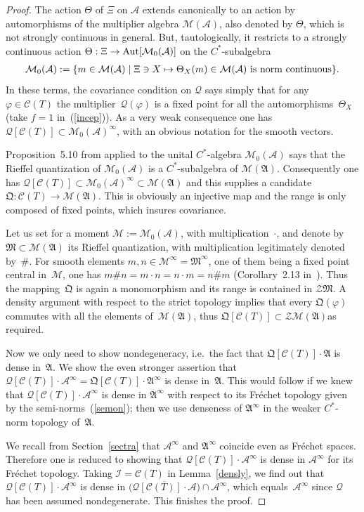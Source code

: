 \documentclass[pdftex]{sigma}
\def\A{{\mathcal A}}
\def\Th{\Theta}
\def\QQ{\mathfrak Q}
\def\AA{\mathfrak A}
\def\C{\mathcal{C}}
\def\Q{\mathcal Q}
\begin{document}
\begin{proof}
The action $\Th$ of $\Xi$ on $\A$ extends canonically to an action by automorphisms of the multiplier algebra
$\mathcal M(\A)$, also denoted by $\Th$, which is not strongly continuous in general.
But, tautologically, it restricts to a strongly continuous action
$\Th:\Xi\rightarrow{\rm Aut}[\mathcal M_0(\A)]$ on the $C^*$-subalgebra
\begin{gather*}%
\mathcal M_0(\A):=\{m\in\mathcal M(\A)\mid\Xi\ni X\mapsto\Th_X(m)\in\mathcal M(\A)\ {\rm is\ norm\ continuous}\}.
\end{gather*}
In these terms, the covariance condition on $\Q$ says simply that for any $\varphi\in\C(T)$ the multip\-lier~$\Q(\varphi)$ is a f\/ixed point for all the automorphisms~$\Th_X$
(take $f=1$ in~(\ref{incep})). As a very weak consequence one has
$\Q[\C(T)]\subset\mathcal M_0(\A)^\infty$, with an obvious notation for the smooth vectors.

Proposition~5.10 from \cite{Rie1} applied to the unital $C^*$-algebra $\mathcal M_0(\A)$ says that the Rief\/fel quantization of
$\mathcal M_0(\A)$ is a $C^*$-subalgebra of $\mathcal M(\AA)$. Consequently one has $\Q[\C(T)]\subset\mathcal M_0(\A)^\infty
\subset\mathcal M(\AA)$ and this supplies a candidate $\QQ:\C(T)\rightarrow\mathcal M(\AA)$.
This is obviously an injective map and the range is only composed of f\/ixed points, which insures covariance.

Let us set for a moment $\mathcal M:=\mathcal M_0(\A)$, with multiplication~$\cdot$, and denote by
$\mathfrak M\subset\mathcal M(\AA)$ its Rief\/fel quantization, with multiplication legitimately denoted by~$\#$.
For smooth elements $m,n\in\mathcal M^\infty=\mathfrak M^\infty$, one of them being a f\/ixed point central in~$\mathcal M$,
one has $m\#n=m\cdot n=n\cdot m=n\#m$ (Corollary~2.13 in~\cite{Rie1}).
Thus the mapping~$\QQ$ is again a monomorphism and its range is contained in $\mathcal Z\mathfrak M$.
A density argument with respect to the strict topology implies that every $\mathfrak Q(\varphi)$
commutes with all the elements of~$\mathcal M(\AA)$, thus $\QQ[\C(T)]\subset\mathcal Z\mathcal M(\AA)$as required.

Now we only need to show nondegeneracy, i.e.\ the fact that $\QQ[\C(T)]\cdot\AA$ is dense in~$\AA$.
We show the even stronger assertion that $\Q[\C(T)]\cdot\A^\infty=\QQ[\C(T)]\cdot\AA^\infty$ is dense in~$\AA$.
This would follow if we knew that $\Q[\C(T)]\cdot\A^\infty$ is dense in $\AA^\infty$ with respect to its Fr\'echet topology
given by the semi-norms~(\ref{semon});
then we use denseness of $\AA^\infty$ in the weaker $C^*$-norm topology of~$\AA$.

We recall from Section~\ref{sectra} that $\A^\infty$ and $\AA^\infty$ coincide even as Fr\'echet spaces.
Therefore one is reduced to showing that $\Q[\C(T)]\cdot\A^\infty$ is dense in $\A^\infty$ for its Fr\'echet topology.
Taking $\mathcal I=\C(T)$ in Lemma~\ref{densly}, we f\/ind out that $\Q[\C(T)]\cdot\A^\infty$ is dense in
$\big(\overline{\Q[\C(T)]\cdot\A}\big)\cap\A^\infty$, which equals~$\A^\infty$ since $\Q$ has been assumed
nondegenerate. This f\/inishes the proof.
\end{proof}
\end{document}
